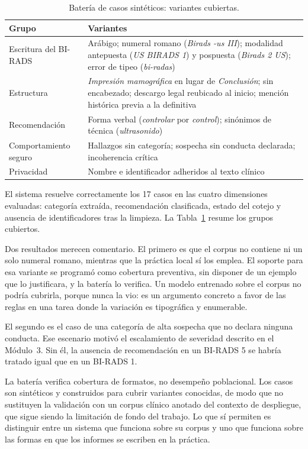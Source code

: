 \documentclass[10pt,journal,a4paper]{IEEEtran}
\begin{document}
\begin{table}[!t]
\caption{Bater\'ia de casos sint\'eticos: variantes cubiertas.}
\label{tab:formatos}
\centering
\begin{tabular}{@{}p{2.3cm}p{5.4cm}@{}}
\toprule
\textbf{Grupo} & \textbf{Variantes} \\
\midrule
Escritura del BI-RADS & Ar\'abigo; numeral romano (\emph{Birads -us III}); modalidad antepuesta (\emph{US BIRADS 1}) y pospuesta (\emph{Birads 2 US}); error de tipeo (\emph{bi-radas}) \\
Estructura & \emph{Impresi\'on mamogr\'afica} en lugar de \emph{Conclusi\'on}; sin encabezado; descargo legal reubicado al inicio; menci\'on hist\'orica previa a la definitiva \\
Recomendaci\'on & Forma verbal (\emph{controlar} por \emph{control}); sin\'onimos de t\'ecnica (\emph{ultrasonido}) \\
Comportamiento seguro & Hallazgos sin categor\'ia; sospecha sin conducta declarada; incoherencia cr\'itica \\
Privacidad & Nombre e identificador adheridos al texto cl\'inico \\
\bottomrule
\end{tabular}
\end{table}

El sistema resuelve correctamente los 17 casos en las cuatro dimensiones evaluadas: categor\'ia extra\'ida, recomendaci\'on clasificada, estado del cotejo y ausencia de identificadores tras la limpieza. La Tabla~\ref{tab:formatos} resume los grupos cubiertos.

Dos resultados merecen comentario. El primero es que el corpus no contiene ni un solo numeral romano, mientras que la pr\'actica local s\'i los emplea. El soporte para esa variante se program\'o como cobertura preventiva, sin disponer de un ejemplo que lo justificara, y la bater\'ia lo verifica. Un modelo entrenado sobre el corpus no podr\'ia cubrirla, porque nunca la vio: es un argumento concreto a favor de las reglas en una tarea donde la variaci\'on es tipogr\'afica y enumerable.

El segundo es el caso de una categor\'ia de alta sospecha que no declara ninguna conducta. Ese escenario motiv\'o el escalamiento de severidad descrito en el M\'odulo~3. Sin \'el, la ausencia de recomendaci\'on en un BI-RADS 5 se habr\'ia tratado igual que en un BI-RADS 1.

La bater\'ia verifica cobertura de formatos, no desempe\~no poblacional. Los casos son sint\'eticos y construidos para cubrir variantes conocidas, de modo que no sustituyen la validaci\'on con un corpus cl\'inico anotado del contexto de despliegue, que sigue siendo la limitaci\'on de fondo del trabajo. Lo que s\'i permiten es distinguir entre un sistema que funciona sobre su corpus y uno que funciona sobre las formas en que los informes se escriben en la pr\'actica.
\end{document}
